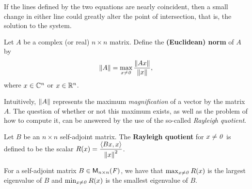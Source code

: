 \begin{note}
  If the lines defined by the two equations are nearly coincident, then a small change in either line could greatly alter the point of intersection, that is, the solution to the system.
\end{note}

\begin{defn}\label{6.10.3}
  Let \(A\) be a complex (or real) \(n \times n\) matrix.
  Define the \textbf{(Euclidean) norm} of \(A\) by
  \[
    \left\lVert A\right\rVert = \max_{x \neq \mathit{0}} \dfrac{\left\lVert Ax\right\rVert}{\left\lVert x\right\rVert},
  \]
  where \(x \in \mathbb{C}^n\) or \(x \in \mathbb{R}^n\).
\end{defn}

\begin{note}
  Intuitively, \(\left\lVert A\right\rVert\) represents the maximum \emph{magnification} of a vector by the matrix \(A\).
  The question of whether or not this maximum exists, as well as the problem of how to compute it, can be answered by the use of the so-called \emph{Rayleigh quotient}.
\end{note}

\begin{defn}\label{6.10.4}
  Let \(B\) be an \(n \times n\) self-adjoint matrix.
  The \textbf{Rayleigh quotient} for \(x \neq \mathit{0}\) is defined to be the scalar \(R(x) = \dfrac{\left\langle Bx, x\right\rangle}{\left\lVert x\right\rVert^2}\).
\end{defn}

\begin{thm}\label{6.43}
  For a self-adjoint matrix \(B \in \ms[n][n][\F]\), we have that \(\max_{x \neq \mathit{0}} R(x)\) is the largest eigenvalue of \(B\) and \(\min_{x \neq \mathit{0}} R(x)\) is the smallest eigenvalue of \(B\).
\end{thm}

